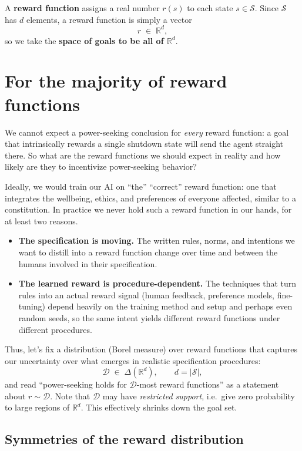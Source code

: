 \documentclass[11pt]{article}
\newcommand{\cS}{\mathcal{S}}
\newcommand{\R}{\mathbb{R}}
\newcommand{\Dist}{\mathcal{D}}    %
\begin{document}
\begin{definition}\label{def:reward}
A \textbf{reward function} assigns a real number $r(s)$ to each state $s\in\cS$. Since
$\cS$ has $d$ elements, a reward function is simply a vector
$$
r \;\in\; \R^{d},
$$
so we take the \textbf{space of goals to be all of $\R^d$}. 
\end{definition}


\section{For the majority of reward functions}

We cannot expect a power-seeking conclusion for \emph{every} reward function: a goal that
intrinsically rewards a single shutdown state will send the agent straight there.
So what are the reward functions we should expect in reality and how likely are they to incentivize power-seeking behavior?

Ideally, we would train our AI on ``the'' ``correct'' reward function: one that
integrates the wellbeing, ethics, and preferences of everyone affected, similar to a constitution. In practice we never hold such a reward function in our hands,
for at least two reasons.
\begin{itemize}\itemsep=2pt
  \item \textbf{The specification is moving.} The written rules, norms, and intentions we
  want to distill into a reward function change over time and between the humans involved in their specification.
  \item \textbf{The learned reward is procedure-dependent.} The techniques that turn rules
  into an actual reward signal (human feedback, preference models, fine-tuning) depend
  heavily on the training method and setup and perhaps even random seeds, so the same intent yields different reward
  functions under different procedures.
\end{itemize}

Thus, let's fix a distribution (Borel measure) over reward functions that captures our uncertainty over what emerges in realistic specification procedures:
$$
\Dist \;\in\; \Delta(\R^{d}), \qquad d = |\cS|,
$$
and read ``power-seeking holds for $\Dist$-most reward functions'' as a statement about
$r \sim \Dist$.
Note that $\Dist$ may have \emph{restricted support}, i.e.\ give zero probability to large regions
of $\R^{d}$. This effectively shrinks down the goal set.

\subsection*{Symmetries of the reward distribution}
\end{document}
